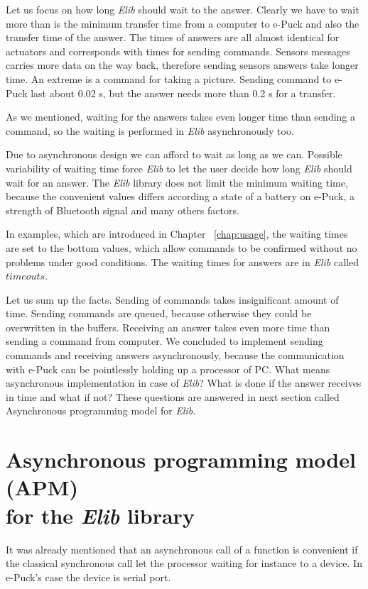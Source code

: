   Let us focus on how long {\it Elib} should wait to the answer.
  Clearly we have to wait more than is the minimum transfer time from a computer to e-Puck and also
  the transfer time of the answer.
  The times of answers are all almost identical for actuators and corresponds with times for sending commands.
  Sensors messages carries more data on the way back, therefore sending sensors answers take longer time.
  An extreme is a command for taking a picture. Sending command to e-Puck last about 0.02 s, but
  the answer needs more than 0.2 s for a transfer.
   
  As we mentioned, waiting for the answers takes even longer time than sending a command,
  so the waiting is performed in {\it Elib} asynchronously too.
   
  Due to asynchronous design we can afford to wait as long as we can. 
  Possible variability of waiting time force {\it Elib} to let the user decide how long
   {\it Elib} should wait for an answer. The {\it Elib} library does not limit the minimum waiting time,
  because the convenient values differs according a state of a battery on e-Puck, a strength of Bluetooth signal
  and many others factors. 
  
  In examples, which are introduced in Chapter ~\ref{chap:usage}, the waiting times are set to the bottom values,
  which allow commands to be confirmed without no problems under good conditions.
  The waiting times for answers are in {\it Elib} called $timeouts$.
   
  Let us sum up the facts. Sending of commands takes insignificant amount of time.
  Sending commands are queued, because otherwise they could be overwritten in the buffers.
  Receiving an answer takes even more time than sending a command from computer.
  We concluded to implement sending commands and receiving answers asynchronously, because the communication with e-Puck
  can be pointlessly holding up a processor of PC.
  What means asynchronous implementation in case of {\it Elib}? What is done if the answer receives in time
  and what if not? These questions are answered in next section called Asynchronous programming model for {\it Elib}.
\section{Asynchronous programming model (APM)\\ for the {\it Elib} library}
  \label{sec:apm}
  It was already mentioned that an asynchronous call of a function is convenient if the
  classical synchronous call let the processor waiting for instance to a device.
  In e-Puck's case the device is serial port. 
   
